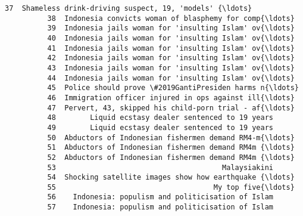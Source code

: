 \documentclass[11pt]{article}
\begin{document}
\begin{Verbatim}[commandchars=\\\{\}]
          37  Shameless drink-driving suspect, 19, 'models' {\ldots}   
          38  Indonesia convicts woman of blasphemy for comp{\ldots}   
          39  Indonesia jails woman for 'insulting Islam' ov{\ldots}   
          40  Indonesia jails woman for 'insulting Islam' ov{\ldots}   
          41  Indonesia jails woman for 'insulting Islam' ov{\ldots}   
          42  Indonesia jails woman for 'insulting Islam' ov{\ldots}   
          43  Indonesia jails woman for 'insulting Islam' ov{\ldots}   
          44  Indonesia jails woman for 'insulting Islam' ov{\ldots}   
          45  Police should prove \#2019GantiPresiden harms n{\ldots}   
          46  Immigration officer injured in ops against ill{\ldots}   
          47  Pervert, 43, skipped his child-porn trial - af{\ldots}   
          48        Liquid ecstasy dealer sentenced to 19 years   
          49        Liquid ecstasy dealer sentenced to 19 years   
          50  Abductors of Indonesian fishermen demand RM4-m{\ldots}   
          51  Abductors of Indonesian fishermen demand RM4m {\ldots}   
          52  Abductors of Indonesian fishermen demand RM4m {\ldots}   
          53                                       Malaysiakini   
          54  Shocking satellite images show how earthquake {\ldots}   
          55                                     My top five{\ldots}   
          56    Indonesia: populism and politicisation of Islam   
          57    Indonesia: populism and politicisation of Islam   
          

\end{Verbatim}
\end{document}
